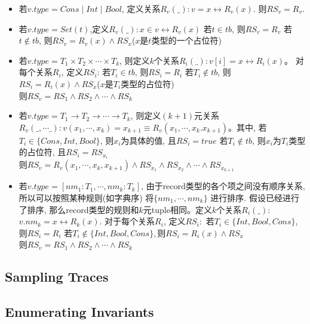 \begin{itemize}
  \item 若$v.type = Cons\mid Int\mid Bool$, 定义关系$R_v(\_):v=x \leftrightarrow R_v(x)$. 
        则$RS_v =R_v$.
  \item 若$v.type = Set(t)$,定义$R_v(\_):x\in v \leftrightarrow R_v(x)$
    \subitem 若$t\in tb$, 则$RS_v = R_v$
    \subitem 若$t \notin tb$, 则$RS_v = R_v(x)\wedge RS_x$($x$是$t$类型的一个占位符)
  \item 若$v.type = T_1\times T_2\times \cdots \times T_k$, 则定义$k$个关系$R_i(\_): v[i]=x \leftrightarrow  R_i(x)$。
        对每个关系$R_i$, 定义$RS_i$:
    \subitem 若$T_i\in tb$, 则$RS_i=R_i$
    \subitem 若$T_i \notin tb$, 则$RS_i=R_i(x) \wedge RS_x$($x$是$T_i$类型的占位符)
      \\
        则$RS_v = RS_1\wedge RS_2\wedge \cdots \wedge RS_k$
  \item 若$v.type = T_1\rightarrow T_2 \rightarrow \cdots \rightarrow T_k$, 则定义$(k+1)$元关系
        $R_v(\_,\cdots\_):v(x_1,\cdots,x_k) = x_{k+1} \equiv R_v(x_1,\cdots,x_k.x_{k+1})$。其中,
    \subitem 若$T_i\in \{Cons,Int,Bool\}$, 则$x_i$为具体的值, 且$RS_i = true$
    \subitem 若$T_i \notin tb$, 则$x_i$为$T_i$类型的占位符, 且$RS_i = RS_{x_i}$
    \\
    则$RS_v = R_v(x_1,\cdots,x_k,x_{k+1}) \wedge RS_{x_1} \wedge RS_{x_2} \wedge \cdots \wedge RS_{x_{k+1}}$
  \item 若$v.type = [nm_1:T_1,\cdots,nm_k:T_k]$, 由于record类型的各个项之间没有顺序关系, 所以可以按照某种规则(如字典序)
      将$\{nm_1,\cdots,nm_k\}$ 进行排序. 假设已经进行了排序, 那么record类型的规则和$k$元tuple相同。定义$k$个关系$R_i(\_)$: 
      $v.nm_k = x \leftrightarrow R_k(x)$. 对于每个关系$R_i$, 定义$RS_i:$
    \subitem 若$T_i \in \{Int,Bool,Cons\}$, 则$RS_i = R_i$
    \subitem 若$T_i \notin \{Int,Bool,Cons\}, 则RS_i = R_i(x)\wedge RS_x$
    \\
  则$RS_v = RS_1\wedge RS_2\wedge \cdots \wedge RS_k$

\end{itemize}


\subsection{Sampling \tlaplus{} Traces} \label{ss:sampling}

\subsection{Enumerating Invariants} \label{ss:enumerating}


